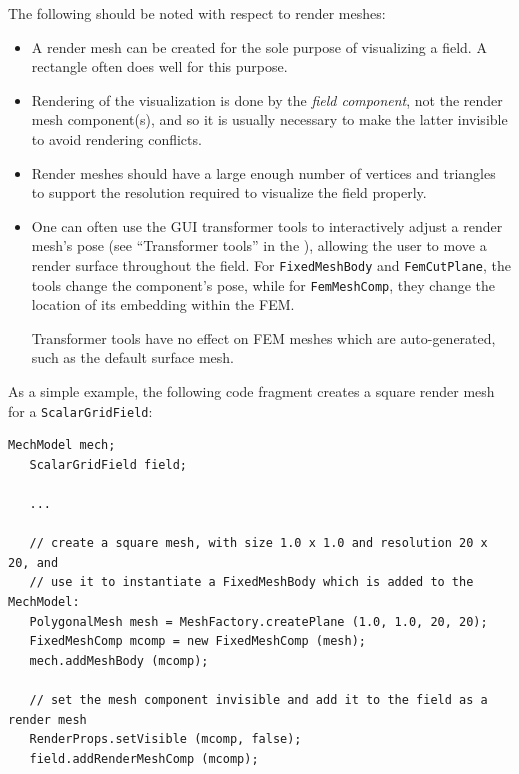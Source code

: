 The following should be noted with respect to render meshes:

\begin{itemize}

\item A render mesh can be created for the sole
purpose of visualizing a field. A rectangle often does well for this
purpose.

\item Rendering of the visualization is done by the {\it field component},
not the render mesh component(s), and so it is usually necessary to
make the latter invisible to avoid rendering conflicts.

\item Render meshes should have a large enough number of vertices and triangles to
support the resolution required to visualize the field properly.

\item One can often use the GUI transformer tools
to interactively adjust a render mesh's pose (see ``Transformer
tools'' in the ), allowing the user to move a render surface throughout the
field.  For {\tt FixedMeshBody} and {\tt FemCutPlane}, the tools
change the component's pose, while for {\tt FemMeshComp}, they change the
location of its embedding within the FEM.

\begin{sideblock}
Transformer tools have no effect on FEM meshes which are
auto-generated, such as the default surface mesh.
\end{sideblock}

\end{itemize}

As a simple example, the following code fragment creates a square
render mesh for a {\tt ScalarGridField}:
%
\begin{lstlisting}[]
   MechModel mech;
   ScalarGridField field;

   ...

   // create a square mesh, with size 1.0 x 1.0 and resolution 20 x 20, and
   // use it to instantiate a FixedMeshBody which is added to the MechModel:
   PolygonalMesh mesh = MeshFactory.createPlane (1.0, 1.0, 20, 20);
   FixedMeshComp mcomp = new FixedMeshComp (mesh);
   mech.addMeshBody (mcomp);

   // set the mesh component invisible and add it to the field as a render mesh
   RenderProps.setVisible (mcomp, false);
   field.addRenderMeshComp (mcomp);
\end{lstlisting}
%

